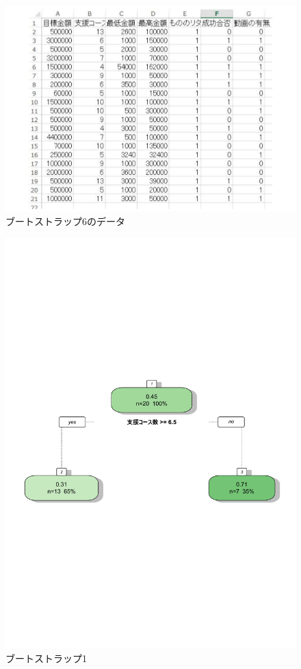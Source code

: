 \begin{figure}[H]
\centering
\includegraphics[width=13cm]{figure53.pdf}
\caption{ブートストラップ6のデータ}\label{sannp}
\end{figure}

\begin{figure}[H]
\centering
\includegraphics[width=13cm]{figure38.pdf}
\caption{ブートストラップ1}\label{sannp}
\end{figure}

